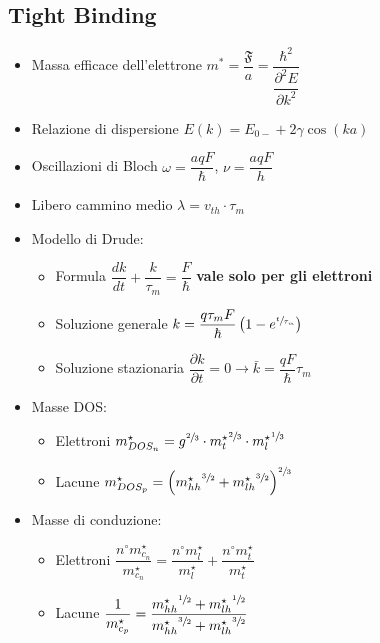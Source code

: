 \documentclass{article}
\begin{document}
\subsection{Tight Binding}
\begin{itemize}
  \item Massa efficace dell'elettrone \( m ^ \ast = \dfrac{ \mathfrak{F} }{a} = \dfrac{\hbar ^ 2}{\dfrac{\partial ^ 2 E}{\partial k ^ 2}} \)
  \item Relazione di dispersione \( E(k) = E_{0-} + 2 \gamma \cos(ka) \)
  \item Oscillazioni di Bloch \( \omega = \dfrac{a q F}{\hbar} \), \( \nu = \dfrac{a q F}{h} \)
  \item Libero cammino medio \( \lambda = v_{th} \cdot \tau_m \)
  \item Modello di Drude:
        \begin{itemize}
          \item Formula \( \dfrac{dk}{dt} + \dfrac{k}{\tau_m}= \dfrac{F}{\hbar} \) \textbf{vale solo per gli elettroni}
          \item Soluzione generale \( k = \dfrac{q \tau_m F}{\hbar} \left( 1 - e^{\sfrac{t}{\tau_m}} \right) \)
          \item Soluzione stazionaria \( \dfrac{\partial k}{\partial t} = 0 \rightarrow \bar{k} = \dfrac{q F}{\hbar} \tau_m \)
        \end{itemize}
  \item Masse DOS:
        \begin{itemize}
          \item Elettroni \( m^{\star}_{DOS_n} = g ^ {\sfrac{2}{3}} \cdot {m^\star_t} ^ {\sfrac{2}{3}} \cdot {m^\star_l} ^ {\sfrac{1}{3}}  \)
          \item Lacune \( m^{\star}_{DOS_p} = \left( {m_{hh}^{\star}} ^ {\sfrac{3}{2}} + {m_{lh}^{\star}} ^ {\sfrac{3}{2}} \right) ^ {\sfrac{2}{3}} \)
        \end{itemize}
  \item Masse di conduzione:
        \begin{itemize}
          \item Elettroni \( \dfrac{n^{\circ} m^\star_{c_n}}{m^\star_{c_n}} = \dfrac{n^{\circ} m_l^\star}{m_l^\star} + \dfrac{n^{\circ} m_t^\star}{m_t^\star} \)
          \item Lacune \( \dfrac{1}{m^\star_{c_p}} = \dfrac{{m^\star_{hh}} ^ {\sfrac{1}{2}} + {m^\star_{lh}} ^ {\sfrac{1}{2}} }{{m^\star_{hh}} ^ {\sfrac{3}{2}} + {m^\star_{lh}} ^ {\sfrac{3}{2}} } \)
        \end{itemize}
\end{itemize}
\end{document}
